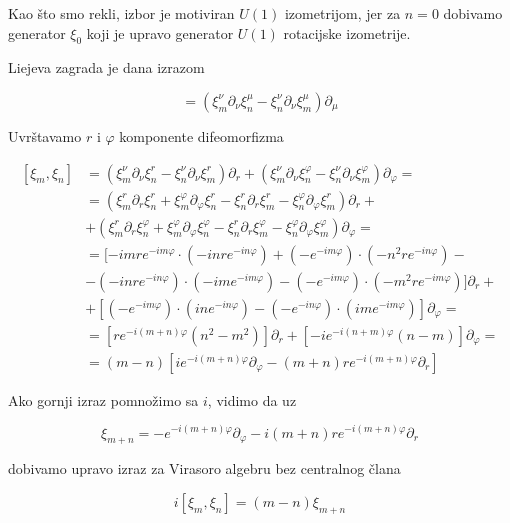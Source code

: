\noindent Kao što smo rekli, izbor je motiviran $U(1)$ izometrijom, jer za $n=0$ dobivamo generator $\xi_0$ koji je upravo generator $U(1)$ rotacijske izometrije.

\noindent Liejeva zagrada je dana izrazom

\begin{equation}
[\xi_m,\xi_n]=(\xi_m^\nu\partial_\nu\xi^\mu_n-\xi^\nu_n\partial_\nu\xi^\mu_m)\partial_\mu
\end{equation}

\noindent Uvrštavamo $r$ i $\varphi$ komponente difeomorfizma

\begin{equation*}
\begin{split}
[\xi_m,\xi_n]&=(\xi^\nu_m\partial_\nu\xi^r_n-\xi^\nu_n\partial_\nu\xi^r_m)\partial_r+(\xi^\nu_m\partial_\nu\xi^\varphi_n-\xi^\nu_n\partial_\nu\xi^\varphi_m)\partial_\varphi=\\
&=(\xi^r_m\partial_r\xi^r_n+\xi^\varphi_m\partial_\varphi\xi^r_n-\xi^r_n\partial_r\xi^r_m-\xi^\varphi_n\partial_\varphi\xi^r_m)\partial_r+\\
&+(\xi^r_m\partial_r\xi^\varphi_n+\xi^\varphi_m\partial_\varphi\xi^\varphi_n-\xi^r_n\partial_r\xi^\varphi_m-\xi^\varphi_n\partial_\varphi\xi^\varphi_m)\partial_\varphi=\\
&=[-imre^{-im\varphi}\cdot(-inre^{-in\varphi})+(-e^{-im\varphi})\cdot(-n^2r e^{-in\varphi})-\\
&-(-inre^{-in\varphi})\cdot(-ime^{-im\varphi})-(-e^{-im\varphi})\cdot(-m^2re^{-im\varphi})]\partial_r+\\
&+[(-e^{-im\varphi})\cdot(ine^{-in\varphi})-(-e^{-in\varphi})\cdot(ime^{-im\varphi})]\partial_\varphi=\\
&=[re^{-i(m+n)\varphi}(n^2-m^2)]\partial_r+[-ie^{-i(n+m)\varphi}(n-m)]\partial_\varphi=\\
&=(m-n)[ie^{-i(m+n)\varphi}\partial_\varphi-(m+n)re^{-i(m+n)\varphi}\partial_r]
\end{split}
\end{equation*}

\noindent Ako gornji izraz pomnožimo sa $i$, vidimo da uz

\begin{equation*}
\xi_{m+n}=-e^{-i(m+n)\varphi}\partial_\varphi-i(m+n)re^{-i(m+n)\varphi}\partial_r
\end{equation*}

\noindent dobivamo upravo izraz za Virasoro algebru bez centralnog člana

\begin{equation}
i[\xi_m,\xi_n]=(m-n)\xi_{m+n}
\end{equation}

